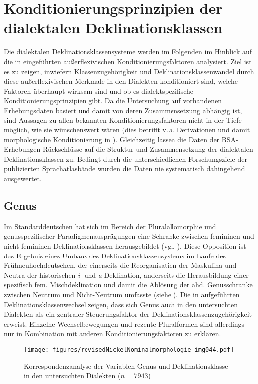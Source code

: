 \section{Konditionierungsprinzipien der dialektalen Deklinationsklassen}\label{sec:8.3}
Die dialektalen Deklinationsklassensysteme werden im Folgenden im Hinblick auf die in  eingeführten außerflexivischen Konditionierungsfaktoren analysiert. Ziel ist es zu zeigen, inwiefern Klassenzugehörigkeit und Deklinationsklassenwandel durch diese außerflexivischen Merkmale in den Dialekten konditioniert sind, welche Faktoren überhaupt wirksam sind und ob es dialektspezifische Konditionierungsprinzipien gibt. Da die Untersuchung auf vorhandenen Erhebungsdaten basiert und damit von deren Zusammensetzung abhängig ist, sind Aussagen zu allen bekannten Konditionierungsfaktoren nicht in der Tiefe möglich, wie sie wünschenswert wären (dies betrifft v.\,a. Derivationen und damit morphologische Konditionierung in ). Gleichzeitig lassen die Daten der BSA-Erhebungen Rückschlüsse auf die Struktur und Zusammensetzung der dialektalen Deklinationsklassen zu. Bedingt durch die unterschiedlichen Forschungsziele der publizierten Sprachatlasbände wurden die Daten nie systematisch dahingehend ausgewertet.

\subsection{Genus}
\label{sec:8.3.1}
Im Standarddeutschen hat sich im Bereich der Pluralallomorphie und genusspezifischer Paradigmenausprägungen eine Schranke zwischen femininen und nicht-femininen Deklinationsklassen herausgebildet (vgl. ). Diese Opposition ist das Ergebnis eines Umbaus des Deklinationsklassensystems im Laufe des Frühneuhochdeutschen, der einerseits die Reorganisation der Maskulina und Neutra der historischen \textit{i}{}- und \textit{a}{}-Deklination, anderseits die Herausbildung einer spezifisch fem. Mischdeklination und damit die Ablösung der ahd. Genusschranke zwischen Neutrum und Nicht-Neutrum umfasste (siehe ). Die in  aufgeführten Deklinationsklassenwechsel zeigen, dass sich Genus auch in den untersuchten Dialekten als ein zentraler Steuerungsfaktor der Deklinationsklassenzugehörigkeit erweist. Einzelne Wechselbewegungen und rezente Pluralformen sind allerdings nur in Kombination mit anderen Konditionierungsfaktoren zu erklären.


\begin{figure}
\texttt{[image: figures/revisedNickelNominalmorphologie-img044.pdf]}
\caption{Korrespondenzanalyse der Variablen Genus und Deklinationsklasse in den untersuchten Dialekten ($n=7943$)}
\label{fig:13}
\end{figure}

